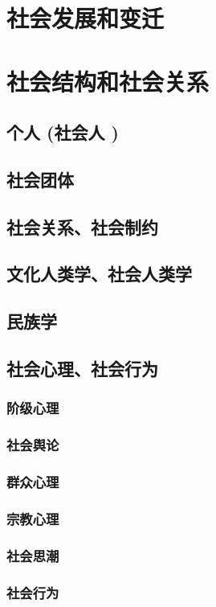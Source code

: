 \documentclass[UTF8]{../RepresentationUniverse}
\begin{document}
\section{社会发展和变迁}
\section{社会结构和社会关系}
    \subsection{个人 (社会人 )}
    \subsection{社会团体}
    \subsection{社会关系、社会制约}
    \subsection{文化人类学、社会人类学}
    \subsection{民族学}
    \subsection{社会心理、社会行为}
        \subsubsection{阶级心理}
        \subsubsection{社会舆论}
        \subsubsection{群众心理}
        \subsubsection{宗教心理}
        \subsubsection{社会思潮}
        \subsubsection{社会行为}
\end{document}
